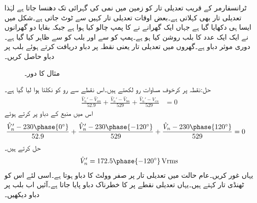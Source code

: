 ٹرانسفارمر کے قریب تعدیلی تار کو زمین میں نمی کی گہرائی تک دھنسا جاتا ہے لہٰذا تعدیلی تار  بھی کہلاتی ہے۔بعض اوقات تعدیلی تار کہیں سے ٹوٹ جاتی ہے۔شکل  میں ایسا ہی دکھایا گیا ہے جہاں ایک گھرانے نے  کا پمپ چالو کیا ہوا ہے جبکہ بقایا دو گھرانوں نے ایک ایک عدد  کا بلب روشن کیا ہو ہے۔پمپ کو  سے اور بلب کو  سے ظاہر کیا گیا ہے۔دوری موثر دباو  ہے۔گھروں میں تعدیلی تار یعنی نقطہ  پر دباو دریافت کرتے ہوئے بلب پر دباو حاصل کریں۔
 \begin{figure}
\centering
{}
\caption{مثال  کا دور۔}
\label{شکل_تین_دوری_تعدیلی_تار_غیر_موجود}
\end{figure}

حل:نقطہ  پر کرخوف مساوات رو لکھتے ہیں۔اس نقطے سے رو کو نکلتا ہوا لیا گیا ہے۔ 
\begin{align*}
\frac{\hat{V}_n'-\hat{V}_{an}}{52.9}+\frac{\hat{V}_n'-\hat{V}_{bn}}{529}+\frac{\hat{V}_n'-\hat{V}_{cn}}{529}&=0
\end{align*} 
اس میں منبع کے دباو پر کرتے ہوئے
\begin{align*}
\frac{\hat{V}_n'-230\phase{0^{\circ}}}{52.9}+\frac{\hat{V}_n'-230\phase{-120^{\circ}}}{529}+\frac{\hat{V}_n-230\phase{120^{\circ}}}{529}&=0
\end{align*} 
حل کرتے ہیں۔
\begin{align*}
\hat{V}_n'=172.5\phase{-120^{\circ}}\,\si{\volt\rms}
\end{align*}
یہاں غور کریں۔عام حالت میں تعدیلی تار پر صفر وولٹ کا دباو ہوتا ہے۔اسی لئے اس کو ٹھنڈی تار کہتے ہیں۔یہاں تعدیلی نقطے پر  کا خطرناک دباو پایا جاتا ہے۔آئیں اب بلب پر دباو دیکھیں۔

